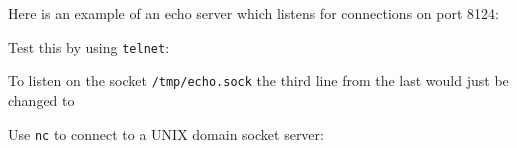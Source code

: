 Here is an example of an echo server which listens for connections on
port 8124:

\begin{Shaded}
\begin{Highlighting}[]
 \NormalTok{(}\NormalTok{);}
 \NormalTok{(}
  \NormalTok{(}\NormalTok{);}
  \NormalTok{(}\NormalTok{, }\NormalTok{() \{}
    \NormalTok{(}\NormalTok{);}
  \NormalTok{\});}
  \NormalTok{(}\NormalTok{);}
\NormalTok{\});}
\NormalTok{(}\NormalTok{, }\NormalTok{() \{ }
  \NormalTok{(}\NormalTok{);}
\NormalTok{\});}
\end{Highlighting}
\end{Shaded}

Test this by using \texttt{telnet}:

\begin{Shaded}
\begin{Highlighting}[]
\end{Highlighting}
\end{Shaded}

To listen on the socket \texttt{/tmp/echo.sock} the third line from the
last would just be changed to

\begin{Shaded}
\begin{Highlighting}[]
\NormalTok{(}\NormalTok{, }\NormalTok{() \{ }
\end{Highlighting}
\end{Shaded}

Use \texttt{nc} to connect to a UNIX domain socket server:

